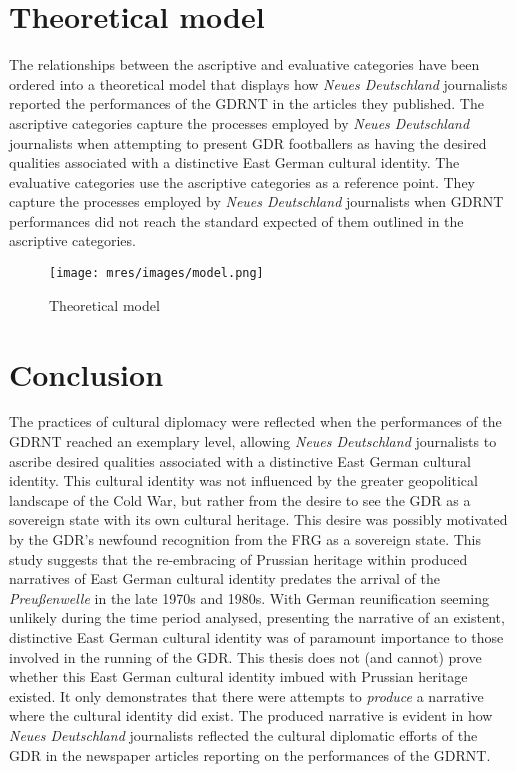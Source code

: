 \section*{Theoretical model}

The relationships between the ascriptive and evaluative categories have been ordered into a theoretical model that displays how \textit{Neues Deutschland} journalists reported the performances of the GDRNT in the articles they published. The ascriptive categories capture the processes employed by \textit{Neues Deutschland} journalists when attempting to present GDR footballers as having the desired qualities associated with a distinctive East German cultural identity. The evaluative categories use the ascriptive categories as a reference point. They capture the processes employed by \textit{Neues Deutschland} journalists when GDRNT performances did not reach the standard expected of them outlined in the ascriptive categories.

\begin{figure}[h!]
\caption{Theoretical model}
\texttt{[image: mres/images/model.png]}
\centering
\label{fig:fig4.1}
\end{figure}

\section*{Conclusion}

The practices of cultural diplomacy were reflected when the performances of the GDRNT reached an exemplary level, allowing \textit{Neues Deutschland} journalists to ascribe desired qualities associated with a distinctive East German cultural identity. This cultural identity was not influenced by the greater geopolitical landscape of the Cold War, but rather from the desire to see the GDR as a sovereign state with its own cultural heritage. This desire was possibly motivated by the GDR’s newfound recognition from the FRG as a sovereign state. This study suggests that the re-embracing of Prussian heritage within produced narratives of East German cultural identity predates the arrival of the \textit{Preußenwelle} in the late 1970s and 1980s. With German reunification seeming unlikely during the time period analysed, presenting the narrative of an existent, distinctive East German cultural identity was of paramount importance to those involved in the running of the GDR. This thesis does not (and cannot) prove whether this East German cultural identity imbued with Prussian heritage existed. It only demonstrates that there were attempts to \textit{produce} a narrative where the cultural identity did exist. The produced narrative is evident in how \textit{Neues Deutschland} journalists reflected the cultural diplomatic efforts of the GDR in the newspaper articles reporting on the performances of the GDRNT. 
